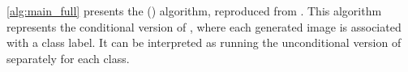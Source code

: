 \section{\privateevolution{}}
\label{app:pe}

\cref{alg:main_full} presents the \privateevolution{} (\pe{}) algorithm, reproduced from \citet{lin2023differentially}.  
This algorithm represents the conditional version of \pe{}, where each generated image is associated with a class label.  
It can be interpreted as running the unconditional version of \pe{} separately for each class.  


